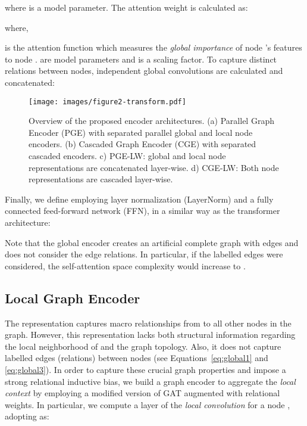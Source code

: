 \documentclass[11pt,a4paper]{article}
\begin{document}
where  is a model parameter. The attention weight  is calculated as:


\noindent where, 

is the attention function which measures the \emph{global importance} of node 's features to node .  are model parameters and  is a scaling factor. 
To capture distinct relations between nodes,  independent global convolutions are calculated and concatenated:




\begin{figure*}[t]
    \centering
    \texttt{[image: images/figure2-transform.pdf]}
    \vspace{-7mm}
    \caption{Overview of the proposed encoder architectures. (a) Parallel Graph Encoder ({\selectfont PGE}) with separated parallel global and local node encoders. (b) Cascaded Graph Encoder ({\selectfont CGE}) with separated cascaded encoders. c) {\selectfont PGE-LW}: global and local node representations are concatenated layer-wise. d) {\selectfont CGE-LW}: Both node representations are cascaded layer-wise.}
    \label{fig:encoder}
\end{figure*}

Finally, we define  employing layer normalization (LayerNorm) and a fully connected feed-forward network (FFN), in a similar way as the transformer architecture:







Note that the global encoder creates an artificial complete graph with  edges and does not consider the edge relations. In particular, if the labelled edges were considered, the self-attention space complexity would increase to .



\subsection{Local Graph Encoder} 
\label{sec:localgraphenc}
The representation  captures macro relationships from  to all other nodes in the graph. However, this representation lacks both structural information regarding the local neighborhood of  and the graph topology. Also, it does not capture labelled edges (relations) between nodes (see Equations~\ref{eq:global1} and \ref{eq:global3}). 
In order to capture these crucial graph properties and impose a strong relational inductive bias, we build a graph encoder to aggregate the \emph{local context} by employing a modified version of GAT augmented with relational weights. In particular, we compute a layer of the \textit{local convolution} for a node , adopting  as:
\end{document}
